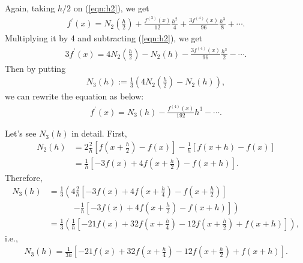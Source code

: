 \documentclass{article}
\begin{document}
\begin{enumerate}
\begin{enumerate}[wide=10pt]
        Again, taking $h/2$ on (\ref{eqn:h2}), we get  \begin{align*}
            f^\prime(x) = N_2 \left (\frac{h}{2} \right ) + \frac{f^{(3)}(x)}{12}\frac{h^2}{4} + \frac{3f^{(4)}(x)}{96}\frac{h^3}{8} + \cdots.
        \end{align*} Multiplying it by 4 and subtracting (\ref{eqn:h2}), we get \begin{align*}
            3f^\prime(x) = 4N_2 \left (\frac{h}{2} \right ) - N_2(h) - \frac{3f^{(4)}(x)}{96}\frac{h^3}{2} - \cdots.
        \end{align*} Then by putting \begin{align}
            N_3(h) := \frac{1}{3} \left ( 4N_2 \left (\frac{h}{2} \right ) - N_2(h) \right ),
        \end{align} we can rewrite the equation as below: \begin{align} \label{eqn:h3}
            f^\prime(x) = N_3(h) - \frac{f^{(4)}(x)}{192}h^3 - \cdots.
        \end{align}

        Let's see $N_3(h)$ in detail. First, \begin{align*}
            N_2(h) & = 2\frac{2}{h}\left [f\left ( x + \frac{h}{2} \right ) - f(x) \right ] - \frac{1}{h}[f(x+h)-f(x)]
            \\ & = \frac{1}{h} \left [ -3f(x) + 4f\left (x + \frac{h}{2} \right ) - f(x+h) \right ].
        \end{align*} Therefore, \begin{align*}
            N_3(h) & = \frac{1}{3} \left( 4\frac{2}{h} \left[ -3f(x) + 4f \left(x+\frac{h}{4} \right) - f \left( x+\frac{h}{2} \right) \right] \right.
            \\ & \quad \quad \quad \left. - \frac{1}{h} \left[ -3f(x) + 4f\left(x + \frac{h}{2} \right) - f(x+h) \right] \right)
            \\ & = \frac{1}{3} \left(\frac{1}{h} \left[-21f(x)+32f\left(x+\frac{h}{4}\right)-12f\left(x+\frac{h}{2}\right)+f(x+h)\right] \right),
        \end{align*} i.e., \begin{align}
            N_3(h) = \frac{1}{3h}\left[-21f(x)+32f\left(x+\frac{h}{4}\right)-12f\left(x+\frac{h}{2}\right)+f(x+h)\right].
        \end{align}


\end{enumerate}
\end{enumerate}
\end{document}

